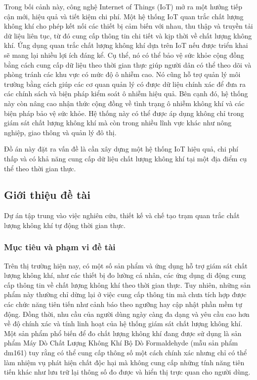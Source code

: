 \documentclass[12pt,a4paper]{article}
\begin{document}
Trong bối cảnh này, công nghệ Internet of Things (IoT) mở ra một hướng tiếp cận mới, hiệu quả và tiết kiệm chi phí. Một hệ thống IoT quan trắc chất lượng không khí cho phép kết nối các thiết bị cảm biến với nhau, thu thập và truyền tải dữ liệu liên tục, từ đó cung cấp thông tin chi tiết và kịp thời về chất lượng không khí. Ứng dụng quan trắc chất lượng không khí dựa trên IoT nếu được triển khai sẽ mang lại nhiều lợi ích đáng kể. Cụ thể, nó có thể bảo vệ sức khỏe cộng đồng bằng cách cung cấp dữ liệu theo thời gian thực giúp người dân có thể theo dõi và phòng tránh các khu vực có mức độ ô nhiễm cao. Nó cũng hỗ trợ quản lý môi trường bằng cách giúp các cơ quan quản lý có được dữ liệu chính xác để đưa ra các chính sách và biện pháp kiểm soát ô nhiễm hiệu quả. Bên cạnh đó, hệ thống này còn nâng cao nhận thức cộng đồng về tình trạng ô nhiễm không khí và các biện pháp bảo vệ sức khỏe. Hệ thống này có thể được áp dụng không chỉ trong giám sát chất lượng không khí mà còn trong nhiều lĩnh vực khác như nông nghiệp, giao thông và quản lý đô thị.

Đồ án này đặt ra vấn đề là cần xây dựng một hệ thống IoT hiệu quả, chi phí thấp và có khả năng cung cấp dữ liệu chất lượng không khí tại một địa điểm cụ thể theo thời gian thực.

\subsection{Giới thiệu đề tài}
Dự án tập trung vào việc nghiên cứu, thiết kế và chế tạo trạm quan trắc chất lượng không khí tự động thời gian thực. 

\subsubsection{Mục tiêu và phạm vi đề tài}
Trên thị trường hiện nay, có một số sản phẩm và ứng dụng hỗ trợ giám sát chất lượng không khí, như các thiết bị đo lường cá nhân, các ứng dụng di động cung cấp thông tin về chất lượng không khí theo thời gian thực. Tuy nhiên, những sản phẩm này thường chỉ dừng lại ở việc cung cấp thông tin mà chưa tích hợp được các chức năng tiên tiến như cảnh báo theo ngưỡng hay cập nhật phần mềm tự động. Đồng thời, nhu cầu của người dùng ngày càng đa dạng và yêu cầu cao hơn về độ chính xác và tính linh hoạt của hệ thống giám sát chất lượng không khí. Một sản phẩm phổ biến để đo chất lượng không khí đang được sử dụng là sản phẩm Máy Dò Chất Lượng Không Khí Bộ Dò Formaldehyde (mẫu sản phẩm dm161) tuy rằng có thể cung cấp thông số một cách chính xác nhưng chỉ có thể làm nhiệm vụ phát hiện chất độc hại mà không cung cấp những tính năng tiên tiến khác như lưu trữ lại thông số đo được và hiển thị trực quan cho người dùng.
\end{document}
